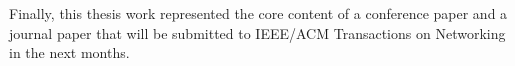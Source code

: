 \documentclass[10pt,a4paper,roman, twocolumn]{article}
\begin{document}

Finally, this thesis work represented the core content of a conference paper and a journal paper that will be submitted to IEEE/ACM Transactions on Networking in the next months.
	 
\end{document}
